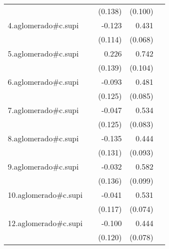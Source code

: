 {\begin{longtable}{l*{4}{D{.}{.}{-1}}}
            &                     &     (0.138)         &     (0.100)         &                     \\
\addlinespace
4.aglomerado#c.supi&                     &      -0.123         &       0.431\sym{***}&                     \\
            &                     &     (0.114)         &     (0.068)         &                     \\
\addlinespace
5.aglomerado#c.supi&                     &       0.226         &       0.742\sym{***}&                     \\
            &                     &     (0.139)         &     (0.104)         &                     \\
\addlinespace
6.aglomerado#c.supi&                     &      -0.093         &       0.481\sym{***}&                     \\
            &                     &     (0.125)         &     (0.085)         &                     \\
\addlinespace
7.aglomerado#c.supi&                     &      -0.047         &       0.534\sym{***}&                     \\
            &                     &     (0.125)         &     (0.083)         &                     \\
\addlinespace
8.aglomerado#c.supi&                     &      -0.135         &       0.444\sym{***}&                     \\
            &                     &     (0.131)         &     (0.093)         &                     \\
\addlinespace
9.aglomerado#c.supi&                     &      -0.032         &       0.582\sym{***}&                     \\
            &                     &     (0.136)         &     (0.099)         &                     \\
\addlinespace
10.aglomerado#c.supi&                     &      -0.041         &       0.531\sym{***}&                     \\
            &                     &     (0.117)         &     (0.074)         &                     \\
\addlinespace
12.aglomerado#c.supi&                     &      -0.100         &       0.444\sym{***}&                     \\
            &                     &     (0.120)         &     (0.078)         &                     \\

\end{longtable}}
